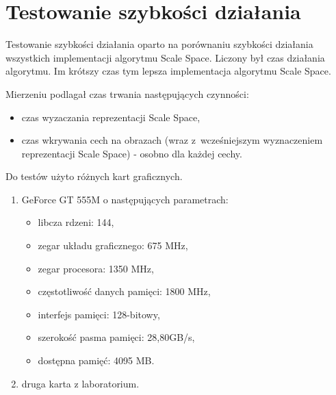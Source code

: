 \section{Testowanie szybkości działania}
\label{sec:testSzybkosc1}

Testowanie szybkości działania oparto na porównaniu szybkości działania wszystkich implementacji algorytmu Scale Space. Liczony był czas działania algorytmu. Im krótszy czas tym lepsza implementacja algorytmu Scale Space.

Mierzeniu podlagał czas trwania następujących czynności:
\begin{itemize}
\item czas wyzaczania reprezentacji Scale Space,
\item czas wkrywania cech na obrazach (wraz z~wcześniejszym wyznaczeniem reprezentacji Scale Space) - osobno dla każdej cechy.
\end{itemize}

Do testów użyto różnych kart graficznych.
\begin{enumerate}
\item GeForce GT 555M \cite{GT555M} o następujących parametrach:
\begin{itemize}
\item libcza rdzeni: 144,
\item zegar układu graficznego: 675 MHz,
\item zegar procesora: 1350 MHz,
\item częstotliwość danych pamięci: 1800 MHz,
\item interfejs pamięci: 128-bitowy,
\item szerokość pasma pamięci: 28,80GB/s,
\item dostępna pamięć: 4095 MB.
\end{itemize}
\item druga karta z laboratorium.
\end{enumerate}



